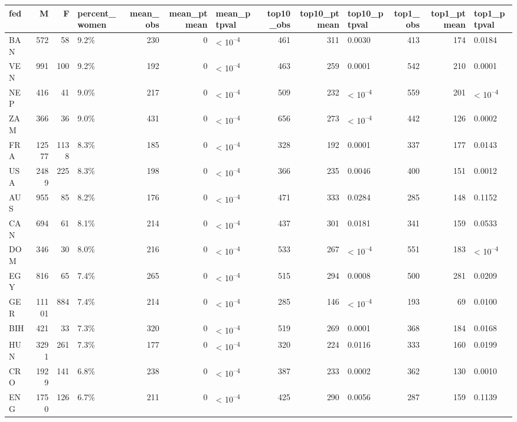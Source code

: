 
\begin{tabular}{l|r|r|l|r|r|l|r|r|l|r|r|l}
\hline
fed & M & F & percent_women & mean_obs & mean_ptmean & mean_ptpval & top10_obs & top10_ptmean & top10_ptpval & top1_obs & top1_ptmean & top1_ptpval\\
\hline
BAN & 572 & 58 & 9.2\% & 230 & 0 & < 10\textsuperscript{--4} & 461 & 311 & 0.0030 & 413 & 174 & 0.0184\\
\hline
VEN & 991 & 100 & 9.2\% & 192 & 0 & < 10\textsuperscript{--4} & 463 & 259 & 0.0001 & 542 & 210 & 0.0001\\
\hline
NEP & 416 & 41 & 9.0\% & 217 & 0 & < 10\textsuperscript{--4} & 509 & 232 & < 10\textsuperscript{--4} & 559 & 201 & < 10\textsuperscript{--4}\\
\hline
ZAM & 366 & 36 & 9.0\% & 431 & 0 & < 10\textsuperscript{--4} & 656 & 273 & < 10\textsuperscript{--4} & 442 & 126 & 0.0002\\
\hline
FRA & 12577 & 1138 & 8.3\% & 185 & 0 & < 10\textsuperscript{--4} & 328 & 192 & 0.0001 & 337 & 177 & 0.0143\\
\hline
USA & 2489 & 225 & 8.3\% & 198 & 0 & < 10\textsuperscript{--4} & 366 & 235 & 0.0046 & 400 & 151 & 0.0012\\
\hline
AUS & 955 & 85 & 8.2\% & 176 & 0 & < 10\textsuperscript{--4} & 471 & 333 & 0.0284 & 285 & 148 & 0.1152\\
\hline
CAN & 694 & 61 & 8.1\% & 214 & 0 & < 10\textsuperscript{--4} & 437 & 301 & 0.0181 & 341 & 159 & 0.0533\\
\hline
DOM & 346 & 30 & 8.0\% & 216 & 0 & < 10\textsuperscript{--4} & 533 & 267 & < 10\textsuperscript{--4} & 551 & 183 & < 10\textsuperscript{--4}\\
\hline
EGY & 816 & 65 & 7.4\% & 265 & 0 & < 10\textsuperscript{--4} & 515 & 294 & 0.0008 & 500 & 281 & 0.0209\\
\hline
GER & 11101 & 884 & 7.4\% & 214 & 0 & < 10\textsuperscript{--4} & 285 & 146 & < 10\textsuperscript{--4} & 193 & 69 & 0.0100\\
\hline
BIH & 421 & 33 & 7.3\% & 320 & 0 & < 10\textsuperscript{--4} & 519 & 269 & 0.0001 & 368 & 184 & 0.0168\\
\hline
HUN & 3291 & 261 & 7.3\% & 177 & 0 & < 10\textsuperscript{--4} & 320 & 224 & 0.0116 & 333 & 160 & 0.0199\\
\hline
CRO & 1929 & 141 & 6.8\% & 238 & 0 & < 10\textsuperscript{--4} & 387 & 233 & 0.0002 & 362 & 130 & 0.0010\\
\hline
ENG & 1750 & 126 & 6.7\% & 211 & 0 & < 10\textsuperscript{--4} & 425 & 290 & 0.0056 & 287 & 159 & 0.1139\\

\end{tabular}
